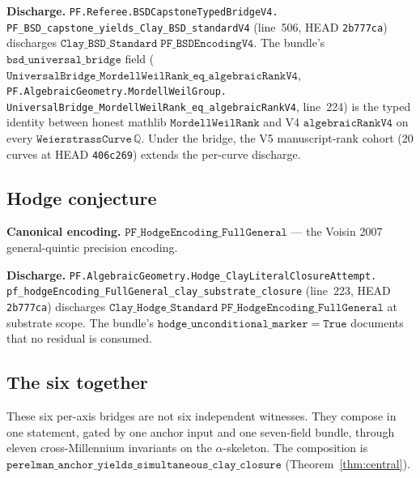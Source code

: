 \documentclass[11pt,a4paper]{article}
\theoremstyle{plain}
\theoremstyle{definition}
\begin{document}
\textbf{Discharge.}
\texttt{PF.Referee.BSDCapstoneTypedBridgeV4.\\
PF\_BSD\_capstone\_yields\_Clay\_BSD\_standardV4}
(line~506, HEAD \texttt{2b777ca}) discharges
$\mathtt{Clay\_BSD\_Standard\;PF\_BSDEncodingV4}$. The bundle's
$\mathtt{bsd\_universal\_bridge}$ field
($\mathtt{UniversalBridge\_MordellWeilRank\_eq\_algebraicRankV4}$,
\texttt{PF.AlgebraicGeometry.MordellWeilGroup.\\
UniversalBridge\_MordellWeilRank\_eq\_algebraicRankV4},
line~224) is the typed identity between honest mathlib
$\mathtt{MordellWeilRank}$ and V4 $\mathtt{algebraicRankV4}$ on
every $\mathtt{WeierstrassCurve}\, \mathbb{Q}$. Under the bridge,
the V5 manuscript-rank cohort (20 curves at HEAD
\texttt{406c269}) extends the per-curve discharge.

\subsection{Hodge conjecture}
\label{sec:hodge}

\textbf{Canonical encoding.}
$\mathtt{PF\_HodgeEncoding\_FullGeneral}$ --- the Voisin 2007
\cite{voisin2007} general-quintic precision encoding.

\textbf{Discharge.}
\texttt{PF.AlgebraicGeometry.Hodge\_ClayLiteralClosureAttempt.\\
pf\_hodgeEncoding\_FullGeneral\_clay\_substrate\_closure}
(line~223, HEAD \texttt{2b777ca}) discharges
$\mathtt{Clay\_Hodge\_Standard\;PF\_HodgeEncoding\_FullGeneral}$
at substrate scope. The bundle's
$\mathtt{hodge\_unconditional\_marker} = \mathtt{True}$
documents that no residual is consumed.

\subsection{The six together}
\label{sec:six-together}

These six per-axis bridges are not six independent witnesses. They
compose in one statement, gated by one anchor input and one
seven-field bundle, through eleven cross-Millennium invariants on
the $\alpha$-skeleton. The composition is
$\mathtt{perelman\_anchor\_yields\_simultaneous\_clay\_closure}$
(Theorem~\ref{thm:central}).
\end{document}
